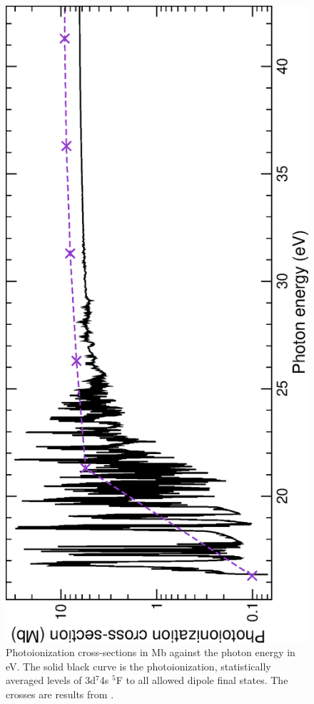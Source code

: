 %
\begin{figure}
\centering
\includegraphics[scale=0.83, angle=-90]{Figures/Cobalt/photo/meta.eps}
\caption{Photoionization cross-sections in Mb against the photon energy in eV. The solid black curve is the photoionization, statistically averaged levels of 3d$^7$4s $^5$F to all allowed dipole final states. The crosses are results from \citet{1979ApJS...40..815R}. \label{fig:co_excited}}
\end{figure}
%

